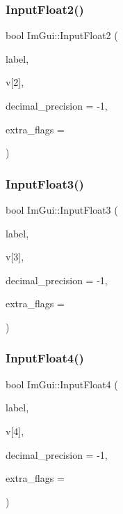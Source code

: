 \hypertarget{namespace_im_gui_a0c7aea6408696de9696f38a2f32419c4}{}\label{namespace_im_gui_a0c7aea6408696de9696f38a2f32419c4} 
\subsubsection{\texorpdfstring{Input\+Float2()}{InputFloat2()}}
{\footnotesize\ttfamily bool Im\+Gui\+::\+Input\+Float2 (\begin{DoxyParamCaption}\item[{const char $\ast$}]{label,  }\item[{float}]{v\mbox{[}2\mbox{]},  }\item[{int}]{decimal\+\_\+precision = {\ttfamily -\/1},  }\item[{Im\+Gui\+Input\+Text\+Flags}]{extra\+\_\+flags = {} }\end{DoxyParamCaption})}

\hypertarget{namespace_im_gui_a77e8d23f2e0477d11a7eb6b0aa773eb9}{}\label{namespace_im_gui_a77e8d23f2e0477d11a7eb6b0aa773eb9} 
\subsubsection{\texorpdfstring{Input\+Float3()}{InputFloat3()}}
{\footnotesize\ttfamily bool Im\+Gui\+::\+Input\+Float3 (\begin{DoxyParamCaption}\item[{const char $\ast$}]{label,  }\item[{float}]{v\mbox{[}3\mbox{]},  }\item[{int}]{decimal\+\_\+precision = {\ttfamily -\/1},  }\item[{Im\+Gui\+Input\+Text\+Flags}]{extra\+\_\+flags = {} }\end{DoxyParamCaption})}

\hypertarget{namespace_im_gui_a2c9bbb9a99bd8fee134a196fd1ec3dfb}{}\label{namespace_im_gui_a2c9bbb9a99bd8fee134a196fd1ec3dfb} 
\subsubsection{\texorpdfstring{Input\+Float4()}{InputFloat4()}}
{\footnotesize\ttfamily bool Im\+Gui\+::\+Input\+Float4 (\begin{DoxyParamCaption}\item[{const char $\ast$}]{label,  }\item[{float}]{v\mbox{[}4\mbox{]},  }\item[{int}]{decimal\+\_\+precision = {\ttfamily -\/1},  }\item[{Im\+Gui\+Input\+Text\+Flags}]{extra\+\_\+flags = {} }\end{DoxyParamCaption})}

